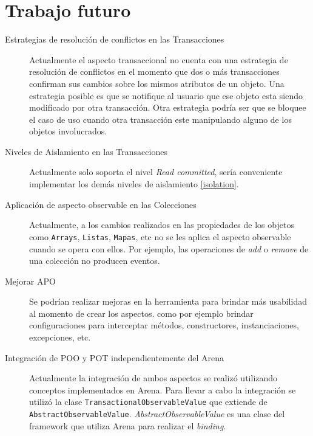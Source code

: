 
\section{Trabajo futuro}
\label{futurework}

\begin{description}

	\item[Estrategias de resolución de conflictos en las Transacciones]
		Actualmente el aspecto transaccional no cuenta con una estrategia de
		resolución de conflictos en	 el momento que dos o más transacciones
		confirman sus cambios sobre los mismos atributos de un objeto.
		Una estrategia posible es que se notifique al usuario que ese
		objeto esta siendo modificado por otra transacción.
		Otra estrategia podría ser que se bloquee el caso de uso cuando otra
		transacción este manipulando alguno de los objetos involucrados.

	\item[Niveles de Aislamiento en las Transacciones]
		Actualmente solo soporta el nivel \emph{Read committed}, sería conveniente
		implementar los demás niveles de aislamiento \ref{isolation}.
	
	\item[Aplicación de aspecto observable en las Colecciones]
		Actualmente, a los cambios realizados en las propiedades de los objetos
		como \lstinline|Arrays|, \lstinline|Listas|, \lstinline|Mapas|, etc no se les
		aplica el aspecto observable cuando se opera con ellos. Por ejemplo, las
		operaciones de \emph{add} o \emph{remove} de una colección no producen
		eventos.
		
	\item[Mejorar APO]
		Se podrían realizar mejoras en la herramienta para brindar más usabilidad al
		momento de crear los aspectos. como por ejemplo brindar configuraciones para
		interceptar métodos, constructores, instanciaciones, excepciones, etc.
		
	\item[Integración de POO y POT independientemente del Arena]
		Actualmente la integración de ambos aspectos se realizó utilizando conceptos
		implementados en Arena. Para llevar a cabo la integración se utilizó la clase
		\lstinline|TransactionalObservableValue| que extiende de
		\lstinline|AbstractObservableValue|. \emph{AbstractObservableValue} es una
		clase del framework que utiliza Arena para realizar el \emph{binding}.

\end{description}